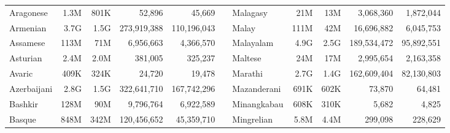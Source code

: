\begin{table*}[t!]
{\begin{tabular}{@{}lrrrrclrrrr@{}}
            Aragonese                 & 1.3M                     & 801K                      & 52,896                   & 45,669                    &                          & Malagasy                  & 21M                      & 13M                       & 3,068,360                & 1,872,044                 \\
            Armenian                  & 3.7G                     & 1.5G                      & 273,919,388              & 110,196,043               &                          & Malay                     & 111M                     & 42M                       & 16,696,882               & 6,045,753                 \\
            Assamese                  & 113M                     & 71M                       & 6,956,663                & 4,366,570                 &                          & Malayalam                 & 4.9G                     & 2.5G                      & 189,534,472              & 95,892,551                \\
            Asturian                  & 2.4M                     & 2.0M                      & 381,005                  & 325,237                   &                          & Maltese                   & 24M                      & 17M                       & 2,995,654                & 2,163,358                 \\
            Avaric                    & 409K                     & 324K                      & 24,720                   & 19,478                    &                          & Marathi                   & 2.7G                     & 1.4G                      & 162,609,404              & 82,130,803                \\
            Azerbaijani               & 2.8G                     & 1.5G                      & 322,641,710              & 167,742,296               &                          & Mazanderani               & 691K                     & 602K                      & 73,870                   & 64,481                    \\
            Bashkir                   & 128M                     & 90M                       & 9,796,764                & 6,922,589                 &                          & Minangkabau               & 608K                     & 310K                      & 5,682                    & 4,825                     \\
            Basque                    & 848M                     & 342M                      & 120,456,652              & 45,359,710                &                          & Mingrelian                & 5.8M                     & 4.4M                      & 299,098                  & 228,629                   \\

\end{tabular}}
\end{table*}
